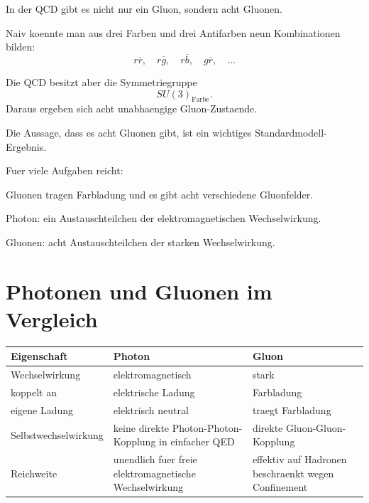In der QCD gibt es nicht nur ein Gluon, sondern acht Gluonen.

\begin{conceptbox}
Naiv koennte man aus drei Farben und drei Antifarben neun Kombinationen bilden:
\[
    r\overline{r},
    \quad
    r\overline{g},
    \quad
    r\overline{b},
    \quad
    g\overline{r},
    \quad
    \ldots
\]

Die QCD besitzt aber die Symmetriegruppe
\[
    SU(3)_{\mathrm{Farbe}}.
\]
Daraus ergeben sich acht unabhaengige Gluon-Zustaende.
\end{conceptbox}

\begin{notebox}
Die Aussage, dass es acht Gluonen gibt, ist ein wichtiges Standardmodell-Ergebnis.

Fuer viele Aufgaben reicht:
\begin{center}
Gluonen tragen Farbladung und es gibt acht verschiedene Gluonfelder.
\end{center}
\end{notebox}

\begin{examtipbox}
Photon:
ein Austauschteilchen der elektromagnetischen Wechselwirkung.

Gluonen:
acht Austauschteilchen der starken Wechselwirkung.
\end{examtipbox}

\section{Photonen und Gluonen im Vergleich}

\begin{center}
\begin{tabular}{|p{4.0cm}|p{5.0cm}|p{5.0cm}|}
\hline
Eigenschaft & Photon & Gluon \\
\hline
Wechselwirkung & elektromagnetisch & stark \\
\hline
koppelt an & elektrische Ladung & Farbladung \\
\hline
eigene Ladung & elektrisch neutral & traegt Farbladung \\
\hline
Selbstwechselwirkung & keine direkte Photon-Photon-Kopplung in einfacher QED & direkte Gluon-Gluon-Kopplung \\
\hline
Reichweite & unendlich fuer freie elektromagnetische Wechselwirkung & effektiv auf Hadronen beschraenkt wegen Confinement \\
\hline
\end{tabular}
\end{center}

